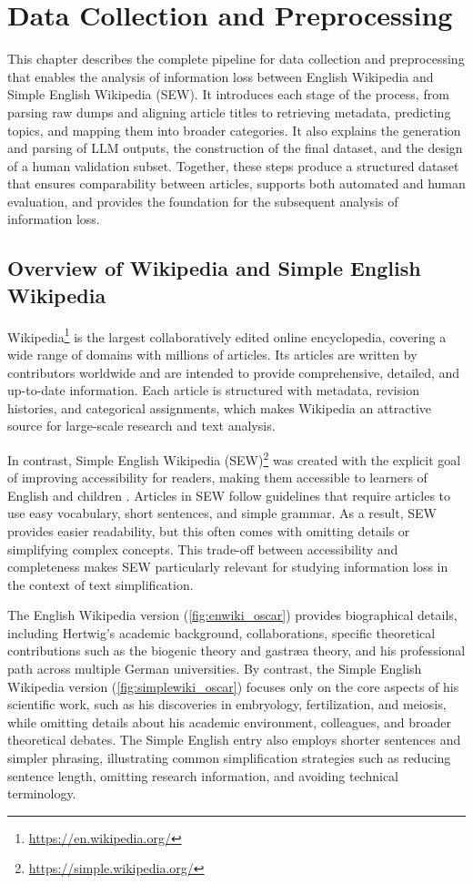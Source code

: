 \documentclass{DESSThesis}
\begin{document}
\chapter{Data Collection and Preprocessing}
This chapter describes the complete pipeline for data collection and preprocessing that enables the analysis of information loss between English Wikipedia and Simple English Wikipedia (SEW). It introduces each stage of the process, from parsing raw dumps and aligning article titles to retrieving metadata, predicting topics, and mapping them into broader categories. It also explains the generation and parsing of LLM outputs, the construction of the final dataset, and the design of a human validation subset. Together, these steps produce a structured dataset that ensures comparability between articles, supports both automated and human evaluation, and provides the foundation for the subsequent analysis of information loss.

\section{Overview of Wikipedia and Simple English Wikipedia}

Wikipedia\footnote{\url{https://en.wikipedia.org/}} is the largest collaboratively edited online encyclopedia, covering a wide range of domains with millions of articles\cite{wikipedia}. Its articles are written by contributors worldwide and are intended to provide comprehensive, detailed, and up-to-date information. Each article is structured with metadata, revision histories, and categorical assignments, which makes Wikipedia an attractive source for large-scale research and text analysis.

In contrast, Simple English Wikipedia (SEW)\footnote{\url{https://simple.wikipedia.org/}} was created with the explicit goal of improving accessibility for readers, making them accessible to learners of English and children \cite{simplewikipedia}. Articles in SEW follow guidelines that require articles to use easy vocabulary, short sentences, and simple grammar. As a result, SEW provides easier readability, but this often comes with omitting details or simplifying complex concepts. This trade-off between accessibility and completeness makes SEW particularly relevant for studying information loss in the context of text simplification.

The English Wikipedia version (\autoref{fig:enwiki_oscar}) provides biographical details, including Hertwig’s academic background, collaborations, specific theoretical contributions such as the biogenic theory and gastræa theory, and his professional path across multiple German universities. By contrast, the Simple English Wikipedia version (\autoref{fig:simplewiki_oscar}) focuses only on the core aspects of his scientific work, such as his discoveries in embryology, fertilization, and meiosis, while omitting details about his academic environment, colleagues, and broader theoretical debates. The Simple English entry also employs shorter sentences and simpler phrasing, illustrating common simplification strategies such as reducing sentence length, omitting research information, and avoiding technical terminology.
\end{document}
